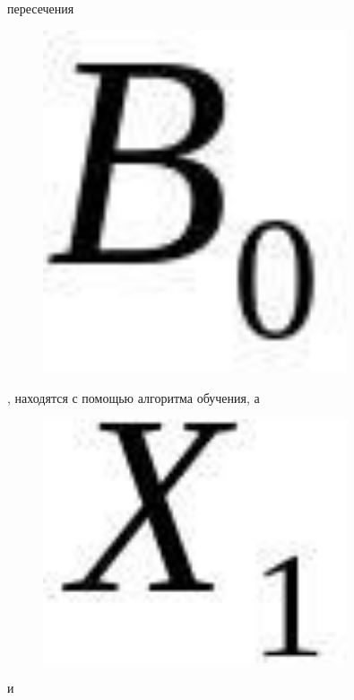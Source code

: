 пересечения \begin{figure}[H]
	\centering
	\includegraphics[width=0.8\textwidth]{assets/107}
	\caption*{}
\end{figure}, находятся с помощью
алгоритма обучения, а \begin{figure}[H]
	\centering
	\includegraphics[width=0.8\textwidth]{assets/108}
	\caption*{}
\end{figure} и

